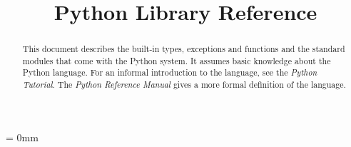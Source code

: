 

\title{Python Library Reference}



\makeindex			%





\maketitle



\begin{abstract}

\noindent
This document describes the built-in types, exceptions and functions
and the standard modules that come with the Python system.  It assumes
basic knowledge about the Python language.  For an informal
introduction to the language, see the {\em Python Tutorial}.  The {\em
Python Reference Manual} gives a more formal definition of the
language.

\end{abstract}

\pagebreak

{
\parskip = 0mm
\tableofcontents
}

\pagebreak






























